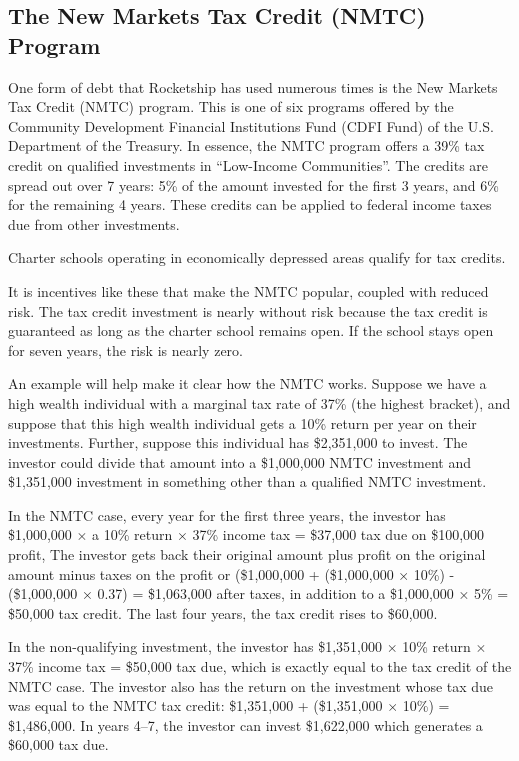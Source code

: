 \subsection{The New Markets Tax Credit (NMTC) Program}%
\label{sec:NMTC}\indent%

One form of debt that Rocketship has used numerous times is the New Markets Tax Credit (NMTC) program. This is one of six programs offered by the Community Development Financial Institutions Fund (CDFI Fund) of the U.S. Department of the Treasury. In essence, the NMTC program offers a 39\% tax credit on qualified investments in ``Low-Income Communities''. The credits are spread out over 7 years: 5\% of the amount invested for the first 3 years, and 6\% for the remaining 4 years. These credits can be applied to federal income taxes due from other investments. 

Charter schools operating in economically depressed areas qualify for tax credits. 

It is incentives like these that make the NMTC popular, coupled with reduced risk. The tax credit investment is nearly without risk because the tax credit is guaranteed as long as the charter school remains open. If the school stays open for seven years, the risk is nearly zero.

An example will help make it clear how the NMTC works. Suppose we have a high wealth individual with a marginal tax rate of 37\% (the highest bracket), and suppose that this high wealth individual gets a 10\% return per year on their investments. Further, suppose this individual has \$2,351,000 to invest. The investor could divide that amount into a \$1,000,000 NMTC investment and \$1,351,000 investment in something other than a qualified NMTC investment.

In the NMTC case, every year for the first three years, the investor has \$1,000,000 $\times$ a 10\% return $\times$ 37\% income tax = \$37,000 tax due on \$100,000 profit, The investor gets back their original amount plus profit on the original amount minus taxes on the profit or (\$1,000,000 + (\$1,000,000 × 10\%) - (\$1,000,000 × 0.37) = \$1,063,000 after taxes, in addition to a \$1,000,000 × 5\% = \$50,000 tax credit. The last four years, the tax credit rises to \$60,000.
  
In the non-qualifying investment, the investor has \$1,351,000 $\times$ 10\% return $\times$ 37\% income tax = \$50,000 tax due, which is exactly equal to the tax credit of the NMTC case. The investor also has the return on the investment whose tax due was equal to the NMTC tax credit: \$1,351,000 + (\$1,351,000 $\times$ 10\%) = \$1,486,000. In years 4–7, the investor can invest \$1,622,000 which generates a \$60,000 tax due.


